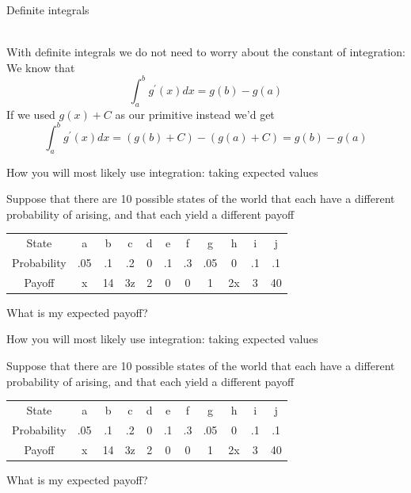 \documentclass[10pt]{seminar}
\begin{document}
\begin{slide}
\begin{itemize}
\end{itemize}


\newslide
Definite integrals

\ \\With definite integrals we do not need to worry about the constant of integration: We know that $$\int_a^b g^\prime(x) dx=g(b)-g(a)$$ If we used $g(x)+C$ as our primitive instead we'd get $$\int_a^b g^\prime(x) dx=(g(b) +C)-(g(a)+C)=g(b)-g(a)$$


\newslide

How you will most likely use integration: taking expected values

\vspace{.2in}

Suppose that there are 10 possible states of the world that each have a different probability of arising, and that each yield a different payoff

\begin{center}
\begin{tabular}{c||c|c|c|c|c|c|c|c|c|c|}
State & a&b &c&d&e&f&g&h&i&j\\
Probability & .05&.1 &.2&0&.1&.3&.05&0&.1&.1\\ \hline 
Payoff & x& 14& 3z&2&0&0&1&2x&3&40

\end{tabular}
\end{center}
\vspace{.2in}
What is my expected payoff?

\newslide



How you will most likely use integration: taking expected values

\vspace{.2in}

Suppose that there are 10 possible states of the world that each have a different probability of arising, and that each yield a different payoff

\begin{center}
\begin{tabular}{c||c|c|c|c|c|c|c|c|c|c|}
State & a&b &c&d&e&f&g&h&i&j\\
Probability & .05&.1 &.2&0&.1&.3&.05&0&.1&.1\\ \hline 
Payoff & x& 14& 3z&2&0&0&1&2x&3&40

\end{tabular}
\end{center}
\vspace{.2in}
What is my expected payoff?


\end{slide}
\end{document}
